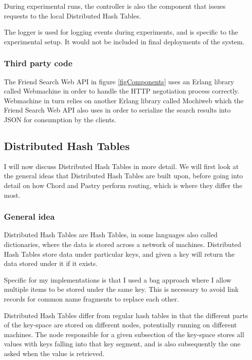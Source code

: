During experimental runs, the controller is also the component that issues requests to the local Distributed Hash Tables.

The logger is used for logging events during experiments, and is specific to the experimental setup. It would not be included in final deployments of the system.

\subsubsection{Third party code}
The Friend Search Web API in figure \ref{figComponents} uses an Erlang library called Webmachine in order to handle the HTTP negotiation process correctly. Webmachine in turn relies on another Erlang library called Mochiweb which the Friend Search Web API also uses in order to serialize the search results into JSON for consumption by the clients.

\subsection{Distributed Hash Tables}
I will now discuss Distributed Hash Tables in more detail. We will first look at the general ideas that Distributed Hash Tables are built upon, before going into detail on how Chord and Pastry perform routing, which is where they differ the most.

\subsubsection{General idea}
Distributed Hash Tables are Hash Tables, in some languages also called dictionaries, where the data is stored across a network of machines. Distributed Hash Tables store data under particular keys, and given a key will return the data stored under it if it exists.

Specific for my implementations is that I used a bag approach where I allow multiple items to be stored under the same key. This is necessary to avoid link records for common name fragments to replace each other.

Distributed Hash Tables differ from regular hash tables in that the different parts of the key-space are stored on different nodes, potentially running on different machines. The node responsible for a given subsection of the key-space stores all values with keys falling into that key segment, and is also subsequently the one asked when the value is retrieved.

